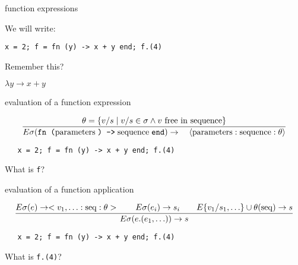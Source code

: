 \begin{frame}[fragile]{function expressions}

\pause\vspace{10pt}
We will write:

\pause\vspace{10pt}\hspace{60pt}\verb!x = 2; f = fn (y) -> x + y end; f.(4) !


\vspace{20pt}\pause
Remember this?

\pause\vspace{10pt}\hspace{60pt} $ \lambda y \rightarrow x + y $

\end{frame}


\begin{frame}[fragile]{evaluation of a function expression}

$$\frac{ \theta = \{ v/s \mid  v/s \in \sigma \wedge v {\rm\ free\  in\ sequence}\}}{
E\sigma(\texttt{fn (} {\rm parameters}\;  \texttt{) ->}\; {\rm sequence}\; \texttt{end} ) \rightarrow \quad \langle{\rm parameters}:{\rm sequence}:\theta\rangle}$$

\vspace{20pt}\pause
\begin{verbatim}
   x = 2; f = fn (y) -> x + y end; f.(4)
\end{verbatim}

\vspace{20pt}\hspace{40pt}What is {\tt f}?

\end{frame}


\begin{frame}[fragile]{evaluation of a function application}

$$\frac{E\sigma(e) \rightarrow <v_1, \ldots:{\rm seq}:\theta > \qquad E\sigma(e_i) \rightarrow s_i \qquad E\{v_1/s_1, \ldots\}\cup\theta({\rm seq}) \rightarrow s}{
E\sigma(e.(e_1, \ldots)) \rightarrow s}$$ 

\vspace{20pt}\pause
\begin{verbatim}
   x = 2; f = fn (y) -> x + y end; f.(4)
\end{verbatim}

\vspace{20pt}\hspace{40pt}What is {\tt f.(4)}?

\end{frame}
 
